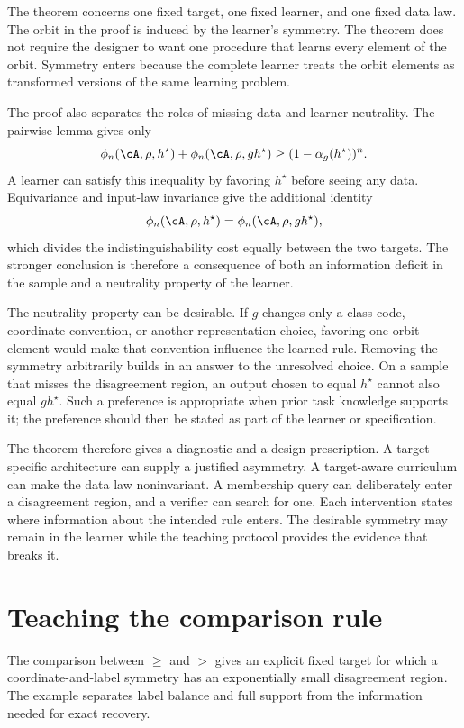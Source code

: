 \documentclass[11pt,twoside]{article}
\theoremstyle{definition}
\theoremstyle{remark}
\begin{document}
The theorem concerns one fixed target, one fixed learner, and one fixed data
law. The orbit in the proof is induced by the learner's symmetry. The theorem
does not require the designer to want one procedure that learns every element
of the orbit. Symmetry enters because the complete learner treats the orbit
elements as transformed versions of the same learning problem.

The proof also separates the roles of missing data and learner neutrality. The
pairwise lemma gives only
\[
 \phi_n(\cA,\rho,h^\star)
 +\phi_n(\cA,\rho,gh^\star)
 \ge(1-\alpha_g(h^\star))^n.
\]
A learner can satisfy this inequality by favoring \(h^\star\) before seeing
any data. Equivariance and input-law invariance give the additional identity
\[
 \phi_n(\cA,\rho,h^\star)
 =\phi_n(\cA,\rho,gh^\star),
\]
which divides the indistinguishability cost equally between the two targets.
The stronger conclusion is therefore a consequence of both an information
deficit in the sample and a neutrality property of the learner.

The neutrality property can be desirable. If \(g\) changes only a class code,
coordinate convention, or another representation choice, favoring one orbit
element would make that convention influence the learned rule. Removing the
symmetry arbitrarily builds in an answer to the unresolved choice. On a sample
that misses the disagreement region, an output chosen to equal \(h^\star\)
cannot also equal \(gh^\star\). Such a preference is appropriate when prior
task knowledge supports it; the preference should then be stated as part of
the learner or specification.

The theorem therefore gives a diagnostic and a design prescription. A
target-specific architecture can supply a justified asymmetry. A target-aware
curriculum can make the data law noninvariant. A membership query can
deliberately enter a disagreement region, and a verifier can search for one.
Each intervention states where information about the intended rule enters.
The desirable symmetry may remain in the learner while the teaching protocol
provides the evidence that breaks it.

\section{Teaching the comparison rule}
\label{sec:comparison}

The comparison between \(\ge\) and \(>\) gives an explicit fixed target for
which a coordinate-and-label symmetry has an exponentially small disagreement region. The
example separates label balance and full support from the information needed
for exact recovery.
\end{document}
